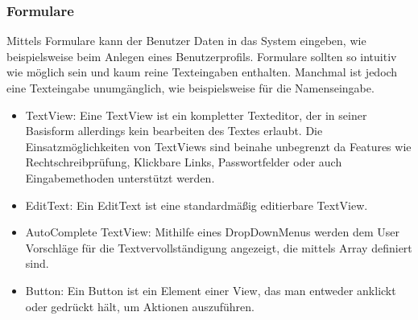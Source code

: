 \documentclass[FIPLY_base.tex]{subfiles}
\begin{document}
\newpage
\subsubsection{Formulare}
Mittels Formulare kann der Benutzer Daten in das System eingeben, wie beispielsweise beim Anlegen eines Benutzerprofils. Formulare sollten so intuitiv wie möglich sein und kaum reine Texteingaben enthalten. Manchmal ist jedoch eine Texteingabe unumgänglich, wie beispielsweise für die Namenseingabe.

\begin{itemize}
	\item TextView: Eine TextView ist ein kompletter Texteditor, der in seiner Basisform allerdings kein bearbeiten des Textes erlaubt. Die Einsatzmöglichkeiten von TextViews sind beinahe unbegrenzt da Features wie Rechtschreibprüfung, Klickbare Links, Passwortfelder oder auch Eingabemethoden unterstützt werden.
	\item EditText: Ein EditText ist eine standardmäßig editierbare TextView.
	\item AutoComplete TextView: Mithilfe eines DropDownMenus werden dem User Vorschläge für die Textvervollständigung angezeigt, die mittels Array definiert sind.
	\item Button: Ein Button ist ein Element einer View, das man entweder anklickt oder gedrückt hält, um Aktionen auszuführen.
\end{itemize}
\end{document}
